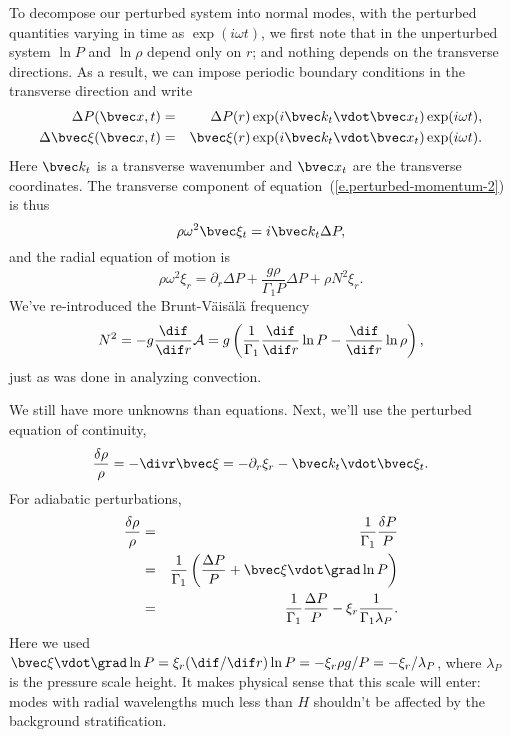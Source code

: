 To decompose our perturbed system into normal modes, with the perturbed quantities varying in time as $\exp(i\omega t)$, we first note that
in the unperturbed system $\ln P$ and $\ln\rho$ depend only on $r$; and nothing depends on the transverse directions.  As a result, we can impose periodic boundary conditions in the transverse direction  and write
\begin{eqnarray*}
\Delta P(\vx,t) &=& \Delta P(r) \exp(i\vkt\vdot \vx_{t})\exp(i\omega t),\\
\Delta \vxi(\vx,t) &=& \vxi(r) \exp(i\vkt\vdot \vx_{t})\exp(i\omega t).
\end{eqnarray*}
Here $\vkt$ is a transverse wavenumber and $\vx_{t}$ are the transverse coordinates.
The transverse component of equation~(\ref{e.perturbed-momentum-2}) is thus
\begin{equation}\label{e.transverse-perturbed-momentum}
\rho\omega^{2} \vxi_{t} = i \vkt \Delta P,
\end{equation}
and the radial equation of motion is
\begin{equation}\label{e.radial-perturbed-momentum}
\rho\omega^{2}\xi_{r} = \partial_{r}\Delta P + \frac{g\rho}{\Gamma_{1}P}\Delta P  + \rho N^{2} \xi_{r}.
\end{equation}
We've re-introduced the Brunt-V\"ais\"al\"a frequency
\[ N^{2} = -g\frac{\dif}{\dif r}\mathcal{A} = g\left(\frac{1}{\Gamma_{1}}\frac{\dif}{\dif r}\ln P - \frac{\dif}{\dif r}\ln \rho\right), \]
just as was done in analyzing convection.

We still have more unknowns than equations.  Next, we'll use the perturbed equation of continuity, 
\begin{equation}\label{e.perturbed-continuity}
\frac{\delta\rho}{\rho} = -\divr\vxi = -\partial_{r}\xi_{r} - \vkt\vdot\vxi_{t}.
\end{equation}
For adiabatic perturbations,
\begin{eqnarray*}
\frac{\delta\rho}{\rho} &=& \frac{1}{\Gamma_{1}}\frac{\delta P}{P}\\ 
	&=& \frac{1}{\Gamma_{1}}\left(\frac{\Delta P}{P} + \vxi\vdot\grad\ln P\right)\\
		&=& \frac{1}{\Gamma_{1}}\frac{\Delta P}{P} - \xi_{r}\frac{1}{\Gamma_{1} \lambda_{P}}.
\end{eqnarray*}
Here we used $\vxi\vdot\grad \ln P = \xi_{r}(\dif/\dif r) \ln P = -\xi_{r}\rho g/P = -\xi_{r}/\lambda_{P}$, where $\lambda_{P}$ is the pressure scale height.  It makes physical sense that this scale will enter: modes with radial wavelengths much less than $H$ shouldn't be affected by the background stratification.

